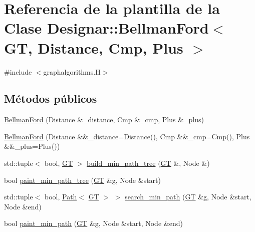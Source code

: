 \hypertarget{class_designar_1_1_bellman_ford}{}\section{Referencia de la plantilla de la Clase Designar\+:\+:Bellman\+Ford$<$ GT, Distance, Cmp, Plus $>$}
\label{class_designar_1_1_bellman_ford}


{\ttfamily \#include $<$graphalgorithms.\+H$>$}

\subsection*{Métodos públicos}
\begin{DoxyCompactItemize}
\item 
\hyperlink{class_designar_1_1_bellman_ford_adb2ea922dfd109d977cb85a5a10873ae}{Bellman\+Ford} (Distance \&\+\_\+distance, Cmp \&\+\_\+cmp, Plus \&\+\_\+plus)
\item 
\hyperlink{class_designar_1_1_bellman_ford_adfac9f09fe6da285aaa8f8d84e9d7982}{Bellman\+Ford} (Distance \&\&\+\_\+distance=Distance(), Cmp \&\&\+\_\+cmp=Cmp(), Plus \&\&\+\_\+plus=Plus())
\item 
std\+::tuple$<$ bool, \hyperlink{demo-buildgraph_8_c_a3001c40d2c31ca87ed96cd7d1334a55e}{GT} $>$ \hyperlink{class_designar_1_1_bellman_ford_a3057f65cedb7e6d214ed838c810b557e}{build\+\_\+min\+\_\+path\+\_\+tree} (\hyperlink{demo-buildgraph_8_c_a3001c40d2c31ca87ed96cd7d1334a55e}{GT} \&, Node \&)
\item 
bool \hyperlink{class_designar_1_1_bellman_ford_a227581a852b2e97be90ac75d1aa8ad5d}{paint\+\_\+min\+\_\+path\+\_\+tree} (\hyperlink{demo-buildgraph_8_c_a3001c40d2c31ca87ed96cd7d1334a55e}{GT} \&g, Node \&start)
\item 
std\+::tuple$<$ bool, \hyperlink{class_designar_1_1_path}{Path}$<$ \hyperlink{demo-buildgraph_8_c_a3001c40d2c31ca87ed96cd7d1334a55e}{GT} $>$ $>$ \hyperlink{class_designar_1_1_bellman_ford_a2363c1e87c7e5ca8778a786db99fcff5}{search\+\_\+min\+\_\+path} (\hyperlink{demo-buildgraph_8_c_a3001c40d2c31ca87ed96cd7d1334a55e}{GT} \&g, Node \&start, Node \&end)
\item 
bool \hyperlink{class_designar_1_1_bellman_ford_aa3bbfc0acd202d4af5e10f7405e8a25c}{paint\+\_\+min\+\_\+path} (\hyperlink{demo-buildgraph_8_c_a3001c40d2c31ca87ed96cd7d1334a55e}{GT} \&g, Node \&start, Node \&end)
\end{DoxyCompactItemize}


